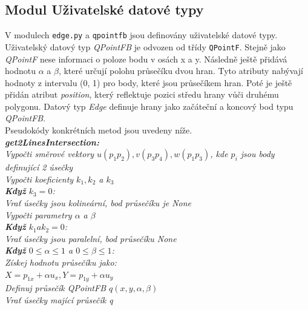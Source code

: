 \documentclass{article}
\begin{document}
\subsection{\small{Modul Uživatelské datové typy}}
V modulech \texttt{edge.py} a \texttt{qpointfb} jsou definovány uživatelské datové typy. Uživatelský datový typ \emph{QPointFB} je odvozen od třídy \texttt{QPointF}. Stejně jako \emph{QPointF} nese informaci o poloze bodu v osách x a y. Následně ještě přidává hodnotu $\alpha$ a $\beta$, které určují polohu průsečíku dvou hran. Tyto atributy nabývají hodnoty z intervalu (0, 1) pro body, které jsou průsečíkem hran. Poté je ještě přidán atribut \emph{position}, který reflektuje pozici středu hrany vůči druhému polygonu. Datový typ \emph{Edge} definuje hrany jako začáteční a koncový bod typu \emph{QPointFB}.\\
Pseudokódy konkrétních metod jsou uvedeny níže.
\vspace{0,2cm}\\
\indent\textit{\textbf{get2LinesIntersection:}}\\
\indent\textit{Vypočti směrové vektory $u(p_{1}p_{2}), v(p_{3}p_{4}), w(p_{1}p_{3})$, kde $p_{i}$ jsou body definující 2 úsečky}\\
\indent\textit{Vypočti koeficienty $k_{1}, k_{2}$ a $k_{3}$}\\
\indent\textit{\textbf{Když} $k_{3} = 0$:}\\
\indent\indent\textit{Vrať úsečky jsou kolineární, bod průsečíku je None}\\
\indent\textit{Vypočti parametry $\alpha$ a $\beta$}\\
\indent\textit{\textbf{Když} $k_{1} a k_{2} = 0$:}\\
\indent\indent\textit{Vrať úsečky jsou paralelní, bod průsečíku None}\\
\indent\textit{\textbf{Když} $0 \leq \alpha \leq 1$ a $0 \leq \beta \leq 1$:}\\
\indent\indent\textit{Získej hodnotu průsečíku jako:}\\
\indent\indent\textit{$X = p_{1x} + \alpha u_{x}, Y = p_{1y} + \alpha u_{y}$}\\
\indent\textit{Definuj průsečík QPointFB $q(x, y, \alpha, \beta)$}\\
\indent\textit{Vrať úsečky mající průsečík q}\\
\vspace{6,5cm}\\
\end{document}

